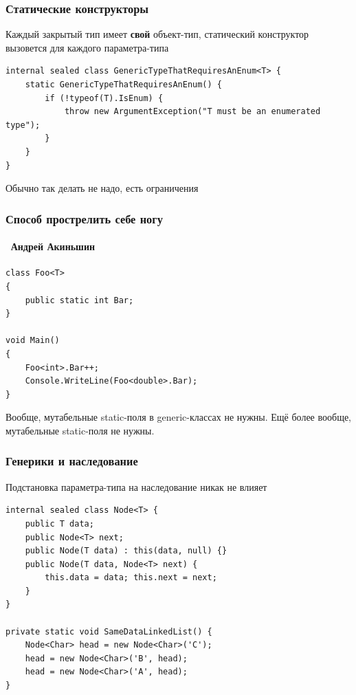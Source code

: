 \documentclass[xetex,mathserif,serif]{beamer}
\begin{document}
	\begin{frame}[fragile]
		\frametitle{Статические конструкторы}
		Каждый закрытый тип имеет \textbf{свой} объект-тип, статический конструктор вызовется для каждого параметра-типа
		\vspace{0.8cm}
		\begin{footnotesize}
			\begin{verbatim}
internal sealed class GenericTypeThatRequiresAnEnum<T> {
    static GenericTypeThatRequiresAnEnum() {
        if (!typeof(T).IsEnum) {
            throw new ArgumentException("T must be an enumerated type");
        }
    }
}
			\end{verbatim}
		\end{footnotesize}
		\vspace{0.8cm}
		Обычно так делать не надо, есть ограничения
	\end{frame}

	\begin{frame}[fragile]
		\frametitle{Способ прострелить себе ногу}
		\framesubtitle{\textcopyright\, Андрей Акиньшин}
		\begin{small}
			\begin{verbatim}
class Foo<T>
{
    public static int Bar;
}

void Main()
{
    Foo<int>.Bar++;
    Console.WriteLine(Foo<double>.Bar);
}
			\end{verbatim}
		\end{small}
		Вообще, мутабельные static-поля в generic-классах не нужны. Ещё более вообще, мутабельные static-поля не нужны.
	\end{frame}

	\begin{frame}[fragile]
		\frametitle{Генерики и наследование}
		Подстановка параметра-типа на наследование никак не влияет
		\begin{footnotesize}
			\begin{verbatim}
internal sealed class Node<T> {
    public T data;
    public Node<T> next;
    public Node(T data) : this(data, null) {}
    public Node(T data, Node<T> next) {
        this.data = data; this.next = next;
    }
}

private static void SameDataLinkedList() {
    Node<Char> head = new Node<Char>('C');
    head = new Node<Char>('B', head);
    head = new Node<Char>('A', head);
}
			\end{verbatim}
		\end{footnotesize}
	\end{frame}
\end{document}
